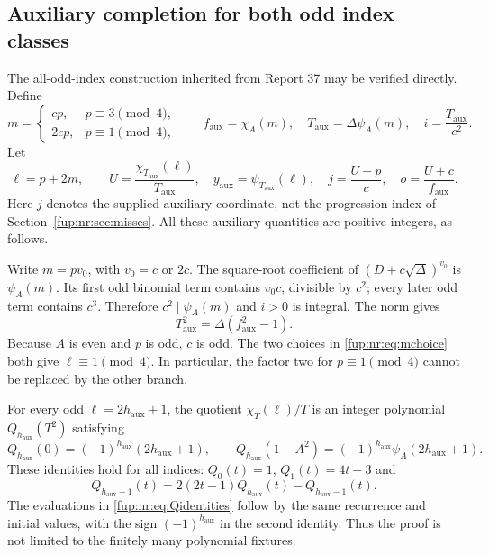 \documentclass[11pt,letterpaper]{article}
\theoremstyle{definition}\newtheorem{definition}[theorem]{Definition}
\theoremstyle{remark}\newtheorem{remark}[theorem]{Remark}
\newcommand{\Taux}{T_{\mathrm{aux}}}\newcommand{\yaux}{y_{\mathrm{aux}}}
\newcommand{\faux}{f_{\mathrm{aux}}}\newcommand{\rmain}{r_{\mathrm{main}}}\newcommand{\acent}{\mathcal F}
\begin{document}
\subsection{Auxiliary completion for both odd index classes}
The all-odd-index construction inherited from Report 37 may be verified directly. Define
\begin{equation}\label{fup:nr:eq:mchoice}
 m=\begin{cases}cp,&p\equiv3\pmod4,\\2cp,&p\equiv1\pmod4,
 \end{cases}\qquad
 \faux=\chi_A(m),\quad\Taux=\Delta\psi_A(m),\quad
 i=\frac{\Taux}{c^2}.
\end{equation}
Let
\begin{equation}\label{fup:nr:eq:auxwitness}
 \ell=p+2m,\qquad
 U=\frac{\chi_{\Taux}(\ell)}{\Taux},\quad
 \yaux=\psi_{\Taux}(\ell),\quad
 j=\frac{U-p}{c},\quad o=\frac{U+c}{\faux}.
\end{equation}
Here $j$ denotes the supplied auxiliary coordinate, not the progression index of Section~\ref{fup:nr:sec:misses}. All these auxiliary quantities are positive integers, as follows.

Write $m=pv_0$, with $v_0=c$ or $2c$. The square-root coefficient of $(D+c\sqrt\Delta)^{v_0}$ is $\psi_A(m)$. Its first odd binomial term contains $v_0c$, divisible by $c^2$; every later odd term contains $c^3$. Therefore $c^2\mid\psi_A(m)$ and $i>0$ is integral. The norm gives
\[
 \Taux^2=\Delta(\faux^2-1).
\]
Because $A$ is even and $p$ is odd, $c$ is odd. The two choices in \eqref{fup:nr:eq:mchoice} both give $\ell\equiv1\pmod4$. In particular, the factor two for $p\equiv1\pmod4$ cannot be replaced by the other branch.

For every odd $\ell=2h_{\mathrm{aux}}+1$, the quotient $\chi_T(\ell)/T$ is an integer polynomial $Q_{h_{\mathrm{aux}}}(T^2)$ satisfying
\begin{equation}\label{fup:nr:eq:Qidentities}
 Q_{h_{\mathrm{aux}}}(0)=(-1)^{h_{\mathrm{aux}}}(2h_{\mathrm{aux}}+1),\qquad
 Q_{h_{\mathrm{aux}}}(1-A^2)=(-1)^{h_{\mathrm{aux}}}\psi_A(2h_{\mathrm{aux}}+1).
\end{equation}
These identities hold for all indices: $Q_0(t)=1$, $Q_1(t)=4t-3$ and
\[
 Q_{h_{\mathrm{aux}}+1}(t)=2(2t-1)Q_{h_{\mathrm{aux}}}(t)-Q_{h_{\mathrm{aux}}-1}(t).
\]
The evaluations in \eqref{fup:nr:eq:Qidentities} follow by the same recurrence and initial values, with the sign $(-1)^{h_{\mathrm{aux}}}$ in the second identity. Thus the proof is not limited to the finitely many polynomial fixtures.
\end{document}
